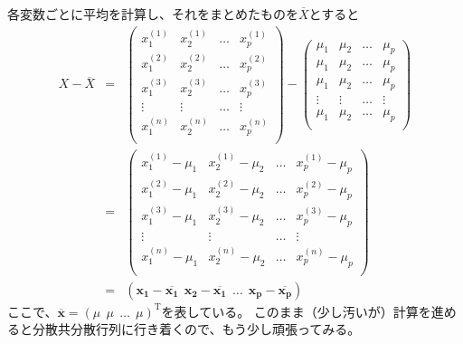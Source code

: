 各変数ごとに平均を計算し、それをまとめたものを$\overline{X}$とすると
\begin{eqnarray}
  X - \overline{X} &=& 
    \left(
  \begin{array}{cccc}
    x_1^{(1)} & x_2^{(1)} & \dots & x_p^{(1)} \\
    x_1^{(2)} & x_2^{(2)} & \dots & x_p^{(2)} \\
    x_1^{(3)} & x_2^{(3)} & \dots & x_p^{(3)} \\
    \vdots    & \vdots    & \dots & \vdots    \\
    x_1^{(n)} & x_2^{(n)} & \dots & x_p^{(n)} \\
  \end{array}
  \right) 
  - 
  \left(
  \begin{array}{cccc}
    \mu_1 & \mu_2 & \dots & \mu_p \\
    \mu_1 & \mu_2 & \dots & \mu_p \\
    \mu_1 & \mu_2 & \dots & \mu_p \\
    \vdots    & \vdots    & \dots & \vdots    \\
    \mu_1 & \mu_2 & \dots & \mu_p \\
  \end{array} 
  \right)\\
  &=&
    \left(
  \begin{array}{cccc}
    x_1^{(1)}-\mu_1 & x_2^{(1)} -\mu_2 & \dots & x_p^{(1)} -\mu_p \\
    x_1^{(2)}-\mu_1 & x_2^{(2)} -\mu_2 & \dots & x_p^{(2)} -\mu_p \\
    x_1^{(3)}-\mu_1 & x_2^{(3)} -\mu_2 & \dots & x_p^{(3)} -\mu_p \\
    \vdots          & \vdots           & \dots & \vdots     \\
    x_1^{(n)}-\mu_1 & x_2^{(n)} -\mu_2 & \dots & x_p^{(n)} -\mu_p \\
  \end{array}
  \right) \\
  &=& 
  (\bm{x_1}-\overline{\bm{x_1}}~~\bm{x_2}-\overline{\bm{x_1}}~~\dots~~\bm{x_p-\overline{\bm{x_p}}})
\end{eqnarray}
ここで、$\overline{\bm{x}}=(\mu~~\mu~~\dots~~\mu)^{\mathrm{T}}$を表している。
このまま（少し汚いが）計算を進めると分散共分散行列に行き着くので、もう少し頑張ってみる。

